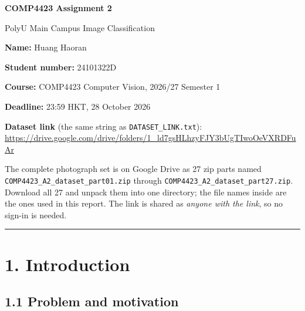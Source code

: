 \documentclass[11pt,a4paper]{article}
\newcommand{\reporttitle}{COMP4423 Assignment 2}
\newcommand{\reportsubtitle}{PolyU Main Campus Image Classification}
\newcommand{\studentname}{Huang Haoran}
\newcommand{\studentnumber}{24101322D}
\newcommand{\dataseturl}{https://drive.google.com/drive/folders/1\_ld7gsHLhzyFJY3bUgTIwoOeVXRDFuAr}
\begin{document}
\begin{titlepage}
\vspace*{3.2cm}
\begin{center}
{\LARGE\bfseries \reporttitle\par}
\vspace{0.7cm}
{\Large \reportsubtitle\par}
\vspace{1.6cm}
{\large \textbf{Name:} \studentname\par}
\vspace{0.2cm}
{\large \textbf{Student number:} \studentnumber\par}
\vspace{0.2cm}
{\large \textbf{Course:} COMP4423 Computer Vision, 2026/27 Semester 1\par}
\vspace{0.2cm}
{\large \textbf{Deadline:} 23:59 HKT, 28 October 2026\par}
\vspace{1.4cm}
\begin{minipage}{0.86\textwidth}\small
\textbf{Dataset link} (the same string as \texttt{DATASET\_\allowbreak{}LINK.txt}):\\
\url{\dataseturl}
\end{minipage}
\vspace{1.0cm}
\begin{minipage}{0.86\textwidth}\small
The complete photograph set is on Google Drive as 27 zip parts named
\texttt{COMP4423\_\allowbreak{}A2\_\allowbreak{}dataset\_\allowbreak{}part01.zip} through
\texttt{COMP4423\_\allowbreak{}A2\_\allowbreak{}dataset\_\allowbreak{}part27.zip}. Download all 27 and unpack them
into one directory; the file names inside are the ones used in this report.
The link is shared as \emph{anyone with the link}, so no sign-in is needed.
\end{minipage}
\end{center}
\vfill
\end{titlepage}

\setcounter{page}{1}
\begin{center}\rule{0.5\linewidth}{0.5pt}\end{center}

\section{1. Introduction}\label{introduction}

\subsection{1.1 Problem and motivation}\label{problem-and-motivation}
\end{document}
